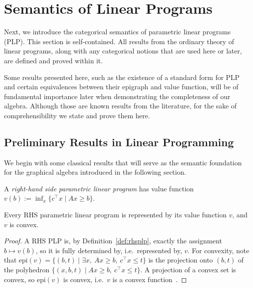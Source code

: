 \section{Semantics of Linear Programs}\label{sec:sem}

Next, we introduce the categorical semantics of parametric linear
programs (PLP). This section is self-contained. All results from the ordinary theory of linear programs, along with any categorical notions that are used here or later, are defined and proved within it.

Some results presented here, such as the existence of a standard form for PLP and certain
equivalences between their epigraph and value function, will be of fundamental importance
later when demonstrating the completeness of our algebra. Although those are known results from the literature, for the sake of comprehensibility we state and prove them here.

\subsection{Preliminary Results in Linear Programming}

We begin with some classical results that will serve as the
semantic foundation for the graphical algebra introduced in the following
section.

\begin{definition}\label{def:rhsplp}
	A \emph{right-hand side parametric linear program} has value function
	$v(b) := \inf_{x} \{ c^\top x \mid Ax \ge b \}$.
\end{definition}

\begin{proposition}\label{prop:representable-convex}
	Every RHS parametric linear program is represented by its value
	function $v$, and $v$ is convex.
\end{proposition}
\begin{proof}
	A RHS PLP is, by Definition~\ref{def:rhsplp}, exactly the assignment
	$b \mapsto v(b)$, so it is fully determined by, i.e.\ represented by,
	$v$. For convexity, note that
	$\mathrm{epi}(v) = \{(b,t) \mid \exists x,\ Ax \ge b,\ c^\top x \le t\}$
	is the projection onto $(b,t)$ of the polyhedron
	$\{(x,b,t) \mid Ax \ge b,\ c^\top x \le t\}$. A projection of a convex
	set is convex, so $\mathrm{epi}(v)$ is convex, i.e.\ $v$ is a convex
	function~\cite{rockafellar1970convex}.
\end{proof}


